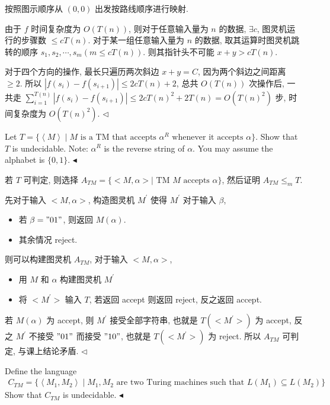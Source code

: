 \documentclass[11pt]{article}
\newenvironment{problem}[2][Problem]{\begin{trivlist}
		\item[\hskip \labelsep {\bfseries #1}\hskip \labelsep {\bfseries #2.}]}{\hfill$\blacktriangleleft$\end{trivlist}}
\newenvironment{answer}[1][Answer]{\begin{trivlist}
		\item[\hskip \labelsep {\bfseries #1.}\hskip \labelsep]}{\hfill$\lhd$\end{trivlist}}
\begin{document}
\begin{answer}
		按照图示顺序从 $(0,0)$ 出发按路线顺序进行映射.
		
		由于 $f$ 时间复杂度为 $O(T(n))$, 则对于任意输入量为 $n$ 的数据, $\exists c$, 图灵机运行的步骤数 $\leq cT(n)$. 对于某一组任意输入量为 $n$ 的数据, 取其运算时图灵机跳转的顺序 $s_1,s_2,\cdots,s_m(m\leq cT(n))$. 则其指针头不可能 $x+y>cT(n)$. 
		
		对于四个方向的操作, 最长只遍历两次斜边 $x+y=C$, 因为两个斜边之间距离 $\geq 2$. 所以 $|f(s_i)-f(s_{i+1})|\leq2cT(n)+2$, 总共 $O(T(n))$ 次操作后, 一共走 $\sum\limits_{i=1}^{T(n)}{|f(s_i)-f(s_{i+1})|}\leq2cT(n)^2+2T(n)=O(T(n)^2)$ 步, 时间复杂度为 $O(T(n)^2)$.
	\end{answer}
	\begin{problem}{5.(16 points)}
		Let $T = \{ \left\langle M\right \rangle \mid M \text{ is a TM that accepts $\alpha^R$ whenever it accepts $\alpha$} \}$. Show that $T$ is undecidable. Note: $\alpha^R$ is the reverse string of $\alpha$. You may assume the alphabet is $\{0, 1\}$.
	\end{problem}
	\begin{answer}
		若 $T$ 可判定, 则选择 $A_{TM}=\{<M,\alpha>\mid \text{ TM } M \text{ accepts }\alpha\}$, 然后证明 $A_{TM}\leq_mT$.
		
		先对于输入 $<M,\alpha>$, 构造图灵机 $M^\prime$ 使得 $M^\prime$ 对于输入 $\beta$,\begin{itemize}
			\item 若 $\beta="01"$, 则返回 $M(\alpha)$.
			\item 其余情况 reject.
		\end{itemize}
		则可以构建图灵机 $A_{TM}$, 对于输入 $<M,\alpha>$,\begin{itemize}
			\item 用 $M$ 和 $\alpha$ 构建图灵机 $M^\prime$
			\item 将 $<M^\prime>$ 输入 $T$, 若返回 accept 则返回 reject, 反之返回 accept.
		\end{itemize}
		若 $M(\alpha)$ 为 accept, 则 $M^\prime$ 接受全部字符串, 也就是 $T(<M^\prime>)$ 为 accept, 反之 $M^\prime$ 不接受 $"01"$ 而接受 $"10"$, 也就是 $T(<M^\prime>)$ 为 reject. 所以 $A_{TM}$ 可判定, 与课上结论矛盾.
	\end{answer}
	\begin{problem}{6.(16 points)}
		Define the language 
		\begin{align*}
			C_{TM} = \{\left\langle M_1, M_2 \right\rangle \mid M_1, M_2 \text{ are two Turing machines such that } L(M_1) \subseteq L(M_2)\}
		\end{align*}
		Show that $C_{TM}$ is undecidable.
	\end{problem}
\end{document}
